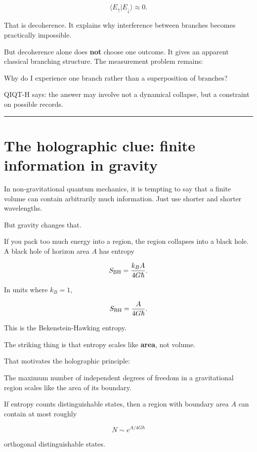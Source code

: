 \documentclass[11pt,a4paper]{article}
\newenvironment{qiqtquote}{\begin{mdframed}[style=quotestyle]}{\end{mdframed}}
\begin{document}
\[
\langle E_\uparrow | E_\downarrow\rangle \approx 0.
\]

That is decoherence. It explains why interference between branches becomes practically impossible.

But decoherence alone does \textbf{not} choose one outcome. It gives an apparent classical branching structure. The measurement problem remains:

\begin{qiqtquote}
Why do I experience one branch rather than a superposition of branches?
\end{qiqtquote}

QIQT-H says: the answer may involve not a dynamical collapse, but a constraint on possible records.

\medskip\hrule\medskip

\section{The holographic clue: finite information in gravity}

In non-gravitational quantum mechanics, it is tempting to say that a finite volume can contain arbitrarily much information. Just use shorter and shorter wavelengths.

But gravity changes that.

If you pack too much energy into a region, the region collapses into a black hole. A black hole of horizon area $A$ has entropy

\[
S_{\rm BH} = \frac{k_B A}{4G\hbar}.
\]

In units where $k_B=1$,

\[
S_{\rm BH} = \frac{A}{4G\hbar}.
\]

This is the Bekenstein-Hawking entropy.

The striking thing is that entropy scales like \textbf{area}, not volume.

That motivates the holographic principle:

\begin{qiqtquote}
The maximum number of independent degrees of freedom in a gravitational region scales like the area of its boundary.
\end{qiqtquote}

If entropy counts distinguishable states, then a region with boundary area $A$ can contain at most roughly

\[
N \sim e^{A/4G\hbar}
\]

orthogonal distinguishable states.
\end{document}
